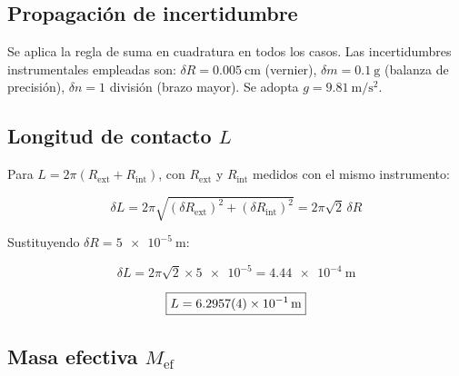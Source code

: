 
\begin{appendices}

\section{Propagación de incertidumbre}
\label{anx:prop_incertidumbre}

Se aplica la regla de suma en cuadratura en todos los casos. Las
incertidumbres instrumentales empleadas son:
$\delta R = \qty{0.005}{\centi\meter}$ (vernier),
$\delta m = \qty{0.1}{\gram}$ (balanza de precisión),
$\delta n = 1$ división (brazo mayor).
Se adopta $g = \qty{9.81}{\meter\per\second\squared}$.

\subsection{Longitud de contacto \texorpdfstring{$L$}{L}}


Para $L = 2\pi(R_{\text{ext}} + R_{\text{int}})$, con $R_{\text{ext}}$
y $R_{\text{int}}$ medidos con el mismo instrumento:

\begin{equation}
    \delta L = 2\pi\sqrt{(\delta R_{\text{ext}})^2 + (\delta R_{\text{int}})^2}
             = 2\pi\sqrt{2}\,\delta R
\end{equation}

Sustituyendo $\delta R = \qty{5e-5}{\meter}$:

\begin{equation*}
    \delta L = 2\pi\sqrt{2} \times \num{5e-5}
             = \qty{4.44e-4}{\meter}
\end{equation*}

\begin{equation*}
    \boxed{L = \qty{6.2957 \pm 0.0004e-1}{\meter}}
\end{equation*}

\subsection{Masa efectiva \texorpdfstring{$M_{\text{ef}}$}{Mef}}


\end{appendices}
